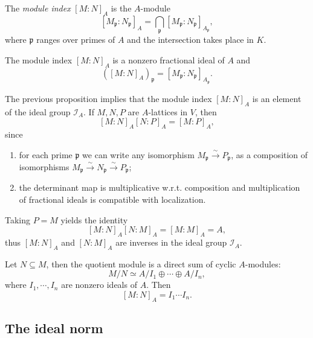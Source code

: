 The \emph{module index} \( [M : N]_A \) is the \( A \)-module
\[
  [M_{\mathfrak{p}}: N_{\mathfrak{p}}]_A = \bigcap_{\mathfrak{p}} [M_{\mathfrak{p}} : N_{\mathfrak{p}}]_{A_{\mathfrak{p}}},
\]
where \( \mathfrak{p} \) ranges over primes of \( A \) and the intersection takes place in \( K \).

\begin{proposition}
  The module index \( [M: N]_A \) is a nonzero fractional ideal of \( A \) and
  \[
    \left([M: N]_A\right)_{\mathfrak{p}} = [M_{\mathfrak{p}}: N_{\mathfrak{p}}]_{A_{\mathfrak{p}}}.
  \]
\end{proposition}

The previous proposition implies that the module index \( [M: N]_A \) is an element of the ideal group \( \mathcal{I}_A \).
If \( M, N, P \) are \( A \)-lattices in \( V \), then
\[
  [M: N]_A [N: P]_A = [M : P]_A,
\]
since
\begin{enumerate}
  \item for each prime \( \mathfrak{p} \) we can write any isomorphism \( M_{\mathfrak{p}} \xrightarrow{\sim} P_{\mathfrak{p}} \), as a composition of isomorphisms \( M_{\mathfrak{p}} \xrightarrow{\sim} N_{\mathfrak{p}} \xrightarrow{\sim} P_{\mathfrak{p}} \);
  \item the determinant map is multiplicative w.r.t. composition and multiplication of fractional ideals is compatible with localization.
\end{enumerate}
Taking \( P = M \) yields the identity
\[
  [M: N]_A [N: M]_A = [M: M]_A = A,
\]
thus \( [M : N]_A \) and \( [N : M]_A \) are inverses in the ideal group \( \mathcal{I}_A \).

\begin{theorem}
  Let \( N \subseteq M \), then the quotient module is a direct sum of cyclic \( A \)-modules:
  \[
    M / N \simeq A / I_1 \oplus \cdots \oplus A / I_n,
  \]
  where \( I_1, \cdots, I_n \) are nonzero ideals of \( A \).
  Then
  \[
    [M : N]_A = I_1 \cdots I_n.
  \]
\end{theorem}

\subsection{The ideal norm}

